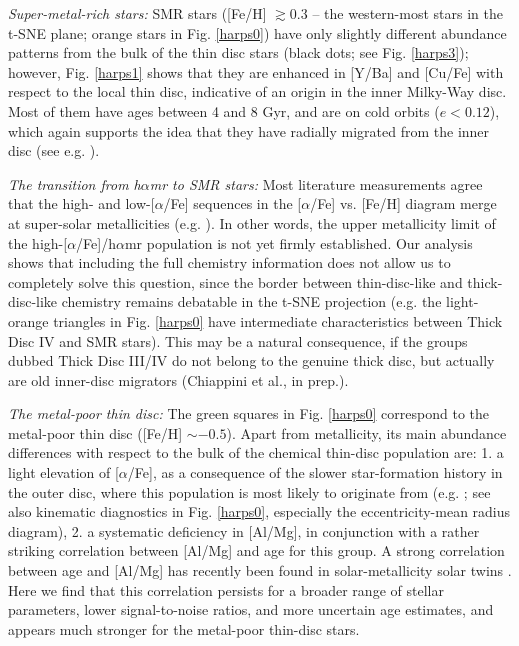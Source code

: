 \documentclass{aa}  %
\begin{document}
{\it Super-metal-rich stars:} SMR stars ([Fe/H] $\gtrsim0.3$ -- the western-most stars in the t-SNE plane; orange stars in Fig. \ref{harps0}) have only slightly different abundance patterns from the bulk of the thin disc stars (black dots; see Fig. \ref{harps3}); however, Fig. \ref{harps1} shows that they are enhanced in [Y/Ba] and [Cu/Fe] with respect to the local thin disc, indicative of an origin in the inner Milky-Way disc. Most of them have ages between 4 and 8 Gyr, and are on cold orbits ($e<0.12$), which again supports the idea that they have radially migrated from the inner disc (see e.g. \citealt{Casagrande2011, Minchev2012, Vera-Ciro2014, Kordopatis2015, Grand2016, Anders2017}).

{\it The transition from h$\alpha$mr to SMR stars:} Most literature measurements agree that the high- and low-[$\alpha$/Fe] sequences in the [$\alpha$/Fe] vs. [Fe/H] diagram merge at super-solar metallicities (e.g. \citealt{Adibekyan2011, Anders2014, Hayden2015}). In other words, the upper metallicity limit of the high-[$\alpha$/Fe]/h$\alpha$mr population is not yet firmly established. Our analysis shows that including the full chemistry information does not allow us to completely solve this question, since the border between thin-disc-like and thick-disc-like chemistry remains debatable in the t-SNE projection (e.g. the light-orange triangles in Fig. \ref{harps0} have intermediate characteristics between Thick Disc IV and SMR stars). This may be a natural consequence, if the groups dubbed Thick Disc III/IV do not belong to the genuine thick disc, but actually are old inner-disc migrators (Chiappini et al., in prep.).

{\it The metal-poor thin disc:} The green squares in Fig. \ref{harps0} correspond to the metal-poor thin disc ([Fe/H] $\sim-0.5$). Apart from metallicity, its main abundance differences with respect to the bulk of the chemical thin-disc population are: 1. a light elevation of [$\alpha$/Fe], as a consequence of the slower star-formation history in the outer disc, where this population is most likely to originate from (e.g. \citealt{Anders2014, Hayden2015}; see also kinematic diagnostics in Fig. \ref{harps0}, especially the eccentricity-mean radius diagram), 2. a systematic deficiency in [Al/Mg], in conjunction with a rather striking correlation between [Al/Mg] and age for this group. A strong correlation between age and [Al/Mg] has recently been found in solar-metallicity solar twins \citep{Nissen2015, Nissen2016, TucciMaia2016, Nissen2017}. Here we find that this correlation persists for a broader range of stellar parameters, lower signal-to-noise ratios, and more uncertain age estimates, and appears much stronger for the metal-poor thin-disc stars.
\end{document}
